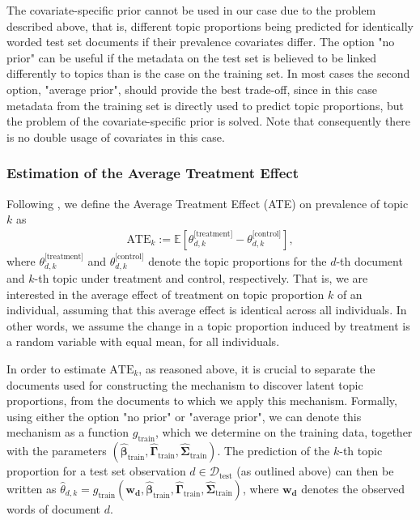 The covariate-specific prior cannot be used in our case due to the problem described above, that is, different topic proportions being predicted for identically worded test set documents if their prevalence covariates differ. The option "no prior" can be useful if the metadata on the test set is believed to be linked differently to topics than is the case on the training set. In most cases the second option, "average prior", should provide the best trade-off, since in this case metadata from the training set is directly used to predict topic proportions, but the problem of the covariate-specific prior is solved. Note that consequently there is no double usage of covariates in this case.

\subsubsection{Estimation of the Average Treatment Effect}
\label{Estimation of the Average Treatment Effect}

Following \cite{egami2018make}, we define the Average Treatment Effect (ATE) on prevalence of topic $k$ as
\begin{align}
\text{ATE}_k := \mathbb{E}[\theta^{\text{[treatment]}}_{d,k} - \theta^{\text{[control]}}_{d,k}],
\end{align}
where $\theta^{\text{[treatment]}}_{d,k}$ and $\theta^{\text{[control]}}_{d,k}$ denote the topic proportions for the $d$-th document and $k$-th topic under treatment and control, respectively. That is, we are interested in the average effect of treatment on topic proportion $k$ of an individual, assuming that this average effect is identical across all individuals. In other words, we assume the change in a topic proportion induced by treatment is a random variable with equal mean, for all individuals. 

In order to estimate $\text{ATE}_k$, as reasoned above, it is crucial to separate the documents used for constructing the mechanism to discover latent topic proportions, from the documents to which we apply this mechanism. Formally, using either the option "no prior" or "average prior", we can denote this mechanism as a function $g_{\text{train}}$, which we determine on the training data, together with the parameters $(\hat{\boldsymbol{\beta}}_{\text{train}}, \hat{\boldsymbol{\Gamma}}_{\text{train}}, \hat{\boldsymbol{\Sigma}}_{\text{train}})$. The prediction of the $k$-th topic proportion for a test set observation $d \in \mathcal{D}_{\text{test}}$ (as outlined above) can then be written as $\hat{\theta}_{d,k} = g_{\text{train}}(\boldsymbol{w_d}, \hat{\boldsymbol{\beta}}_{\text{train}}, \hat{\boldsymbol{\Gamma}}_{\text{train}}, \hat{\boldsymbol{\Sigma}}_{\text{train}})$, where $\boldsymbol{w_d}$ denotes the observed words of document $d$. 

